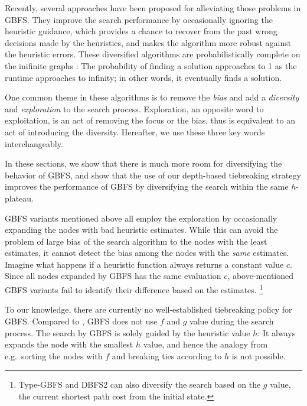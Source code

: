 Recently, several approaches
\cite{imai2011novel,valenzano2014comparison,xie14type} have been
proposed for alleviating those problems in GBFS. They improve the search
performance by occasionally ignoring the heuristic guidance, which
provides a chance to recover from the past wrong decisions made by the
heuristics, and makes the algorithm more robust against the heuristic
errors.  These diversified algorithms are probabilistically complete on
the inifinite graphs \cite{Valenzano2016}: The probability of finding a
solution approaches to 1 as the runtime approaches to infinity; in other
words, it eventually finds a solution.


One common theme in these algorithms is to remove the \emph{bias} and
add a \emph{diversity} and \emph{exploration} to the search process.
Exploration, an opposite word to exploitation, is an act of removing
the focus or the bias, thus is equivalent to an act of introducing the
diversity. Hereafter, we use these three key words interchangeably.

In these sections, we show that there is much more room for diversifying
the behavior of GBFS, and show that the use of our depth-based
tiebreaking strategy improves the performance of GBFS by
diversifying the search within the same $h$-plateau.
 
GBFS variants mentioned above all employ the exploration by occasionally
expanding the nodes with bad heuristic estimates. While this can avoid
the problem of large bias of the search algorithm to the nodes with the
least estimates, it cannot detect the bias among the nodes with the
\emph{same} estimates. Imagine what happens if a heuristic function
always returns a constant value $c$. Since all nodes expanded by GBFS
has the same evaluation $c$, above-mentioned GBFS variants fail to
identify their difference based on the estimates. \footnote{Type-GBFS
and DBFS2 can also diversify the search based on the $g$ value, the
current shortest path cost from the initial state.}

To our knowledge, there are currently no well-established tiebreaking
policy for GBFS.  Compared to \astar, GBFS does not use $f$ and $g$
value during the search process.  The search by GBFS is solely guided by
the heuristic value $h$: It always expands the node with the smallest
$h$ value, and hence the analogy from \astar e.g.\ sorting the nodes
with $f$ and breaking ties according to $h$ is not possible.

